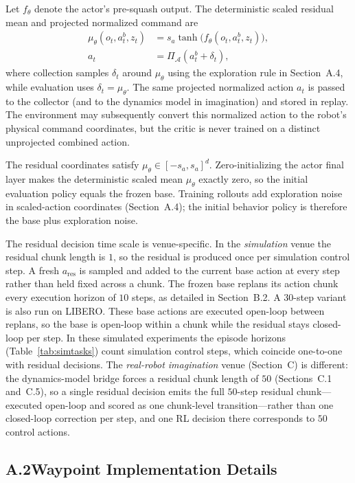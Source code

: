 \documentclass[letterpaper]{article} %
\begin{document}
Let $f_\theta$ denote the actor's pre-squash output. The deterministic scaled
residual mean and projected normalized command are
\[
\begin{aligned}
\mu_\theta(o_t,a_t^b,z_t)
&=s_a\tanh\!\big(f_\theta(o_t,a_t^b,z_t)\big),\\
a_t&=\Pi_{\mathcal A}(a_t^b+\delta_t),
\end{aligned}
\]
where collection samples $\delta_t$ around $\mu_\theta$ using the exploration
rule in Section~A.4, while evaluation uses $\delta_t=\mu_\theta$. The same
projected normalized action $a_t$ is passed to the collector (and to the
dynamics model in imagination) and stored in replay. The environment may
subsequently convert this normalized action to the robot's physical command
coordinates, but the critic is never trained on a distinct unprojected
combined action.

The residual coordinates satisfy
$\mu_\theta\in[-s_a,s_a]^d$. Zero-initializing the actor final layer
makes the deterministic scaled mean $\mu_\theta$ exactly zero, so the
initial evaluation policy equals the frozen base. Training rollouts add
exploration noise in scaled-action coordinates (Section~A.4); the initial
behavior policy is therefore the base plus exploration noise.

The residual decision time scale is venue-specific. In the \emph{simulation} venue the
residual chunk length is $1$, so the residual is produced once per simulation control step.
A fresh $a_{\mathrm{res}}$ is sampled and added to the current base action at every step
rather than held fixed across a chunk. The frozen base replans its action chunk every
execution horizon of $10$ steps, as detailed in Section~B.2. A $30$-step variant is also
run on LIBERO. These base actions are executed open-loop between replans, so the base is open-loop
within a chunk while the residual stays closed-loop per step. In these simulated
experiments the episode horizons (Table~\ref{tab:simtasks}) count simulation control steps,
which coincide one-to-one with residual decisions. The \emph{real-robot imagination} venue
(Section~C) is different: the dynamics-model bridge forces a residual chunk length of $50$
(Sections~C.1 and~C.5), so a single residual decision emits the full $50$-step residual chunk---
executed open-loop and scored as one chunk-level transition---rather than one closed-loop
correction per step, and one RL decision there corresponds to $50$ control actions.

\subsection{A.2\quad Waypoint Implementation Details}
\end{document}
